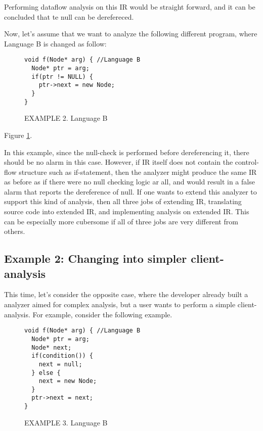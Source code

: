 Performing dataflow analysis on this IR would be straight forward, and it can
be concluded that te null can be derefereced.

Now, let's assume that we want to analyze the following different program,
where Language B is changed as follow:

\begin{figure}[t]
  \centering
  \vspace{2mm}
  \begin{lstlisting}[style=cpp,firstnumber=5,xleftmargin=2.5em]
void f(Node* arg) { //Language B
  Node* ptr = arg;
  if(ptr != NULL) {
    ptr->next = new Node;
  }
}
  \end{lstlisting}
  \vspace*{-.5em}
  \caption{EXAMPLE 2. Language B}
  \label{fig:exam2}
\end{figure}
Figure \ref{fig:exam2}.

In this example, since the null-check is performed before dereferencing it,
there should be no alarm in this case. However, if IR itself does not contain
the control-flow structure such as if-statement, then the analyzer might
produce the same IR as before as if there were no null checking logic ar all,
and would result in a false alarm that reports the dereference of null. If one
wants to extend this analyzer to support this kind of analysis, then all
three jobs of extending IR, translating source code into extended IR, and
implementing analysis on extended IR. This can be especially more cubersome
if all of three jobs are very different from others.

\subsection{Example 2: Changing into simpler client-analysis}

This time, let's consider the opposite case, where the developer already built
a analyzer aimed for complex analysis, but a user wants to perform a 
simple client-analysis. For example, consider the following example.

\begin{figure}[t]
  \centering
  \vspace{2mm}
  \begin{lstlisting}[style=cpp,firstnumber=5,xleftmargin=2.5em]
void f(Node* arg) { //Language B
  Node* ptr = arg;
  Node* next;
  if(condition()) {
    next = null;
  } else {
    next = new Node;
  }
  ptr->next = next;
}
  \end{lstlisting}
  \vspace*{-.5em}
  \caption{EXAMPLE 3. Language B}
  \label{fig:exam3}
\end{figure}


